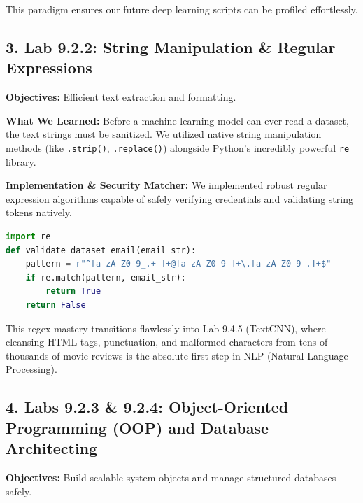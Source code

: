 This paradigm ensures our future deep learning scripts can be profiled
effortlessly.

\hypertarget{lab-9.2.2-string-manipulation-regular-expressions}{%
\subsection{3. Lab 9.2.2: String Manipulation \& Regular
Expressions}\label{lab-9.2.2-string-manipulation-regular-expressions}}

\textbf{Objectives:} Efficient text extraction and formatting.

\textbf{What We Learned:} Before a machine learning model can ever read
a dataset, the text strings must be sanitized. We utilized native string
manipulation methods (like \passthrough{\lstinline!.strip()!},
\passthrough{\lstinline!.replace()!}) alongside Python's incredibly
powerful \passthrough{\lstinline!re!} library.

\textbf{Implementation \& Security Matcher:} We implemented robust
regular expression algorithms capable of safely verifying credentials
and validating string tokens natively.

\begin{lstlisting}[language=Python]
import re
def validate_dataset_email(email_str):
    pattern = r"^[a-zA-Z0-9_.+-]+@[a-zA-Z0-9-]+\.[a-zA-Z0-9-.]+$"
    if re.match(pattern, email_str):
        return True
    return False
\end{lstlisting}

This regex mastery transitions flawlessly into Lab 9.4.5 (TextCNN),
where cleansing HTML tags, punctuation, and malformed characters from
tens of thousands of movie reviews is the absolute first step in NLP
(Natural Language Processing).

\hypertarget{labs-9.2.3-9.2.4-object-oriented-programming-oop-and-database-architecting}{%
\subsection{4. Labs 9.2.3 \& 9.2.4: Object-Oriented Programming (OOP)
and Database
Architecting}\label{labs-9.2.3-9.2.4-object-oriented-programming-oop-and-database-architecting}}

\textbf{Objectives:} Build scalable system objects and manage structured
databases safely.

